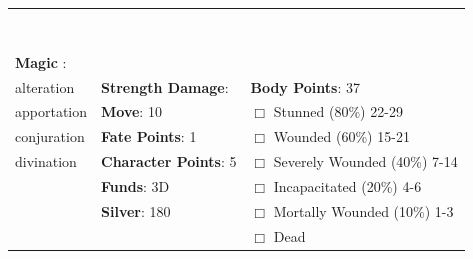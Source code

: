\documentclass[10pt]{article}
\begin{document}
\begin{table}
\begin{tabular}{m{156pt} m{156pt} m{156pt}}
 \hrulefill &  \hrulefill &  \hrulefill \\

 \hrulefill &  \hrulefill &  \hrulefill \\

 \hrulefill &  \hrulefill &  \hrulefill \\

 \hrulefill &  \hrulefill &  \hrulefill \\

 \hrulefill &  \hrulefill &  \hrulefill \\

 \hrulefill &  \hrulefill &  \hrulefill \\

 \hrulefill &  \hrulefill &  \hrulefill \\

                                  &                                 &                             \\
\textbf{Magic }:  \hrulefill  &                                 &                             \\
alteration           \hrulefill & \textbf{Strength Damage}:  \hrulefill                             & \textbf{Body Points}: 37 \hrulefill \\
apportation          \hrulefill                        & \textbf{Move}:             10             \hrulefill    & $\Box$ Stunned \footnotesize{(80\%)} \hfill 22-29 \\
conjuration          \hrulefill                        & \textbf{Fate Points}:      1      \hrulefill    & $\Box$ Wounded \footnotesize{(60\%)} \hfill 15-21 \\
divination           \hrulefill                        & \textbf{Character Points}: 5 \hrulefill    & $\Box$ Severely Wounded \footnotesize{(40\%)} \hfill 7-14 \\
 \hrulefill                        & \textbf{Funds}:            3D            \hrulefill    & $\Box$ Incapacitated \footnotesize{(20\%)} \hfill 4-6 \\
 \hrulefill                        & \textbf{Silver}:           180           \hrulefill    & $\Box$ Mortally Wounded \footnotesize{(10\%)} \hfill 1-3 \\
 \hrulefill                        &  \hrulefill                                                       & $\Box$ Dead   \\
\end{tabular}
\end{table}
\cleardoublepage
\end{document}
